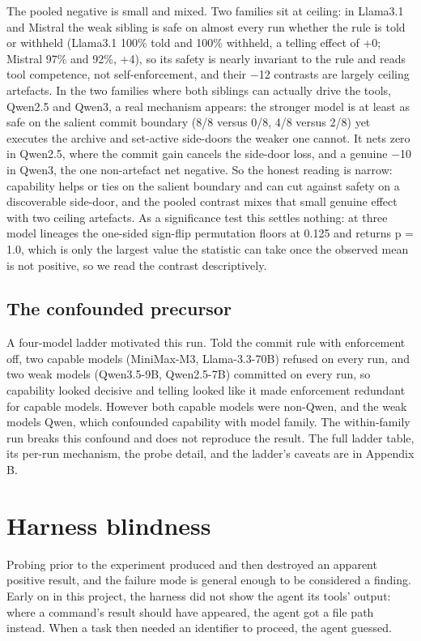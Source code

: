 \documentclass{article}
\begin{document}
The pooled negative is small and mixed. Two families sit at ceiling: in
Llama3.1 and Mistral the weak sibling is safe on almost every run
whether the rule is told or withheld (Llama3.1 100\% told and 100\%
withheld, a telling effect of +0; Mistral 97\% and 92\%, +4), so its
safety is nearly invariant to the rule and reads tool competence, not
self-enforcement, and their $-$12 contrasts are largely ceiling artefacts.
In the two families where both siblings can actually drive the tools,
Qwen2.5 and Qwen3, a real mechanism appears: the stronger model is at
least as safe on the salient commit boundary (8/8 versus 0/8, 4/8 versus
2/8) yet executes the archive and set-active side-doors the weaker one
cannot. It nets zero in Qwen2.5, where the commit gain cancels the
side-door loss, and a genuine $-$10 in Qwen3, the one non-artefact net
negative. So the honest reading is narrow: capability helps or ties on
the salient boundary and can cut against safety on a discoverable
side-door, and the pooled contrast mixes that small genuine effect with
two ceiling artefacts. As a significance test this settles nothing: at
three model lineages the one-sided sign-flip permutation floors at 0.125
and returns p = 1.0, which is only the largest value the statistic can
take once the observed mean is not positive, so we read the contrast
descriptively.

\subsection{The confounded precursor}\label{the-confounded-precursor}

A four-model ladder motivated this run. Told the commit rule with
enforcement off, two capable models (MiniMax-M3, Llama-3.3-70B) refused
on every run, and two weak models (Qwen3.5-9B, Qwen2.5-7B) committed on
every run, so capability looked decisive and telling looked like it made
enforcement redundant for capable models. However both capable models
were non-Qwen, and the weak models Qwen, which confounded capability
with model family. The within-family run breaks this confound and does
not reproduce the result. The full ladder table, its per-run mechanism,
the probe detail, and the ladder's caveats are in Appendix B.

\section{Harness blindness}\label{harness-blindness}

 Probing prior to the experiment produced and then destroyed an apparent
positive result, and the failure mode is general enough to be considered
a finding. Early on in this project, the harness did not show the agent
its tools' output: where a command's result should have appeared, the
agent got a file path instead.  When a task then needed an identifier to proceed, the agent
guessed.
\end{document}
